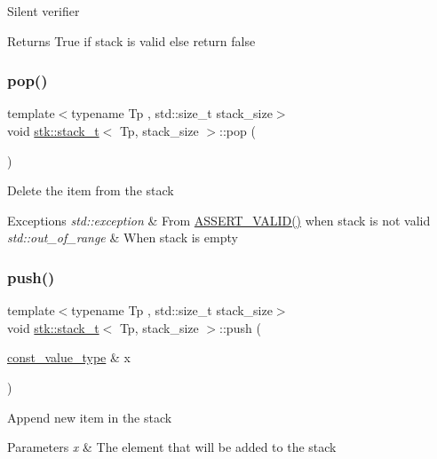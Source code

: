 Silent verifier \begin{DoxyReturn}{Returns}
True if stack is valid else return false 
\end{DoxyReturn}
\mbox{\label{classstk_1_1stack__t_a5be99b150a46b8456643cbc40bcefca8}} 
\subsubsection{\texorpdfstring{pop()}{pop()}}
{\footnotesize\ttfamily template$<$typename Tp , std\+::size\+\_\+t stack\+\_\+size$>$ \\
void \hyperlink{classstk_1_1stack__t}{stk\+::stack\+\_\+t}$<$ Tp, stack\+\_\+size $>$\+::pop (\begin{DoxyParamCaption}{ }\end{DoxyParamCaption})}

Delete the item from the stack 
\begin{DoxyExceptions}{Exceptions}
{\em std\+::exception} & From \hyperlink{stack_8h_a4ad7af85cae2910ffcf6bfbcb8278886}{A\+S\+S\+E\+R\+T\+\_\+\+V\+A\+L\+I\+D()} when stack is not valid \\
\hline
{\em std\+::out\+\_\+of\+\_\+range} & When stack is empty \\
\hline
\end{DoxyExceptions}
\mbox{\label{classstk_1_1stack__t_aad7638faa441f17e91ba9a8f5663be4c}} 
\subsubsection{\texorpdfstring{push()}{push()}}
{\footnotesize\ttfamily template$<$typename Tp , std\+::size\+\_\+t stack\+\_\+size$>$ \\
void \hyperlink{classstk_1_1stack__t}{stk\+::stack\+\_\+t}$<$ Tp, stack\+\_\+size $>$\+::push (\begin{DoxyParamCaption}\item[{\hyperlink{classstk_1_1stack__t_a27d586bc06e0faf30a2a980cd8ffd125}{const\+\_\+value\+\_\+type} \&}]{x }\end{DoxyParamCaption})}

Append new item in the stack 
\begin{DoxyParams}{Parameters}
{\em x} & The element that will be added to the stack \\
\hline
\end{DoxyParams}


